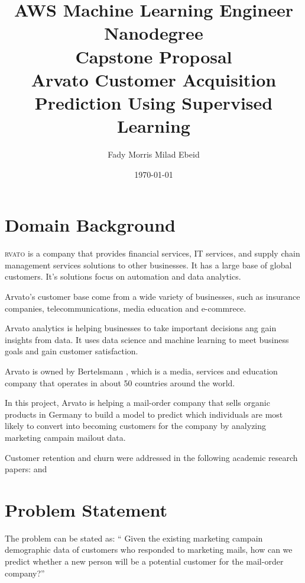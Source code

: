 \documentclass[a4paper]{article}
\title{\bfseries AWS Machine Learning Engineer Nanodegree \\ Capstone Proposal \\ Arvato Customer Acquisition Prediction Using Supervised Learning}
\author{Fady Morris Milad Ebeid}
\begin{document}

\date{\today}
\maketitle
\newpage
\tableofcontents

\newpage
{}
\section{Domain Background}
\lettrine[lines=3,findent=2pt, lraise=0.2]{}{rvato} is a company that provides financial services, IT services, and supply chain management services solutions to other businesses. It has a large base of global customers. It's solutions focus on automation and data analytics.\cite{arvato-company}

Arvato's customer base come from a wide variety of businesses, such as insurance companies, telecommunications, media education and e-commrece. 

Arvato analytics is helping businesses to take important decisions ang gain insights from data. It uses data science and machine learning to meet business goals and gain customer satisfaction.

Arvato is owned by Bertelsmann \cite{bertelsmann-company}, which is a media, services and education company that operates in about 50 countries around the world.

In this project, Arvato is helping a mail-order company that sells organic products in Germany to build a model to predict which individuals are most likely to convert into becoming customers for the company by analyzing marketing campain mailout data.

Customer retention and churn were addressed in the following academic research papers: 
\parencite{al-shatnwai_predicting_2020} and \cite{zhuang_research_2018}


\section{Problem Statement}

The problem can be stated as: `` Given the existing marketing campain demographic data of customers who responded to marketing mails, how can we predict whether a new person will be a potential customer for the mail-order company?''
\end{document}

